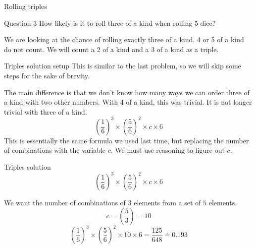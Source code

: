 	\begin{namedframe}{Rolling triples}
		\begin{exampleblock}{Question 3}
			How likely is it to roll three of a kind when rolling 5 dice?
		\end{exampleblock}
		We are looking at the chance of rolling \alert{exactly} three of a kind. 4 or 5 of a kind do \alert{not} count. We \alert{will} count a 2 of a kind and a 3 of a kind as a triple.
	\end{namedframe}
	\begin{namedframe}{Triples solution setup}
		This is similar to the last problem, so we will skip some steps for the sake of brevity.
		\pause

		The main difference is that we don't know how many ways we can order three of a kind with two other numbers. With 4 of a kind, this was trivial. It is not longer trivial with three of a kind.
		\[\left(\frac{1}{6}\right)^3 \times \left(\frac{5}{6}\right)^2 \times c \times 6\]
		This is essentially the same formula we used last time, but replacing the number of combinations with the variable $c$. We must use reasoning to figure out $c$.
	\end{namedframe}
	\begin{namedframe}{Triples solution}
		\[\left(\frac{1}{6}\right)^3 \times \left(\frac{5}{6}\right)^2 \times c \times 6\]
		\pause

		We want the number of combinations of $3$ elements from a set of $5$ elements.
		\pause
		\[c = \binom{5}{3} = 10\]
		\pause
		\[\left(\frac{1}{6}\right)^3 \times \left(\frac{5}{6}\right)^2 \times 10 \times 6 = \frac{125}{648} \doteq 0.193\]
	\end{namedframe}

